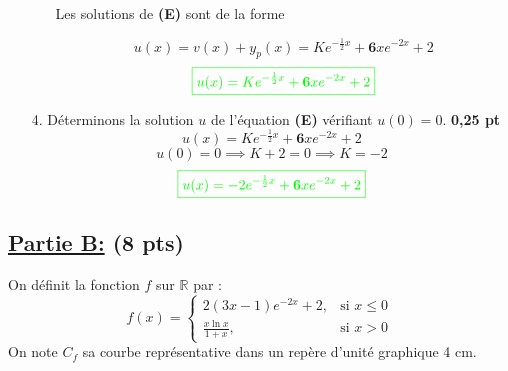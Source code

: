 \documentclass[12pt]{article}
\begin{document}
\begin{itemize}
\begin{itemize}
        Les solutions de \textbf{(E)} sont de la forme 
        
        \[u(x)=v(x)+y_{p}(x)=Ke^{-\frac{1}{2}x}+\textbf{6}xe^{-2x} + 2\]
        \[\color{green}{\boxed{u(x)=Ke^{-\frac{1}{2}x}+\textbf{6}xe^{-2x} + 2}}\]
    \end{itemize}
    \item[4.] Déterminons la solution $u$ de l'équation \textbf{(E)} vérifiant $u(0) = 0$. \textbf{0,25 pt}
    \[u(x)=Ke^{-\frac{1}{2}x}+\textbf{6}xe^{-2x} + 2\]
    \[u(0) = 0 \implies K + 2 = 0 \implies K=-2\]
	\[\color{green}{\boxed{u(x)=-2e^{-\frac{1}{2}x}+\textbf{6}xe^{-2x} + 2}}\]
\end{itemize}
\subsection*{\underline{Partie B:} (8 pts)}
On définit la fonction $f$ sur $\mathbb{R}$ par :
\[
f(x) = \begin{cases} 
  2(3x - 1)e^{-2x} + 2, & \text{si } x \leq 0 \\
  \frac{x\ln x}{1 + x}, & \text{si } x > 0 
\end{cases}
\]
On note $C_{f}$ sa courbe représentative dans un repère d'unité graphique 4 cm.
\end{document}
